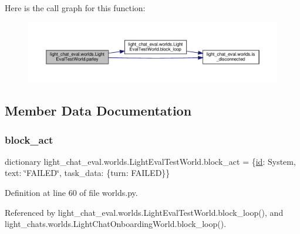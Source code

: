 Here is the call graph for this function\+:
\nopagebreak
\begin{figure}[H]
\begin{center}
\leavevmode
\includegraphics[width=350pt]{classlight__chat__eval_1_1worlds_1_1LightEvalTestWorld_a1cf2385dcf048fff5a7e74b19f8c6917_cgraph}
\end{center}
\end{figure}


\subsection{Member Data Documentation}
\mbox{\label{classlight__chat__eval_1_1worlds_1_1LightEvalTestWorld_a75223ad0eed20c1a3de0a1efac4e833a}} 
\subsubsection{\texorpdfstring{block\+\_\+act}{block\_act}}
{\footnotesize\ttfamily dictionary light\+\_\+chat\+\_\+eval.\+worlds.\+Light\+Eval\+Test\+World.\+block\+\_\+act = \{\textquotesingle{}\hyperlink{classparlai_1_1core_1_1worlds_1_1World_a568184e1c2ccaff10d9a0b69ecb8115a}{id}\textquotesingle{}\+: \textquotesingle{}System\textquotesingle{}, \textquotesingle{}text\textquotesingle{}\+: \char`\"{}F\+A\+I\+L\+ED\char`\"{}, \textquotesingle{}task\+\_\+data\textquotesingle{}\+: \{\textquotesingle{}turn\textquotesingle{}\+: \textquotesingle{}F\+A\+I\+L\+ED\textquotesingle{}\}\}\hspace{0.3cm}{\ttfamily [static]}}



Definition at line 60 of file worlds.\+py.



Referenced by light\+\_\+chat\+\_\+eval.\+worlds.\+Light\+Eval\+Test\+World.\+block\+\_\+loop(), and light\+\_\+chats.\+worlds.\+Light\+Chat\+Onboarding\+World.\+block\+\_\+loop().

